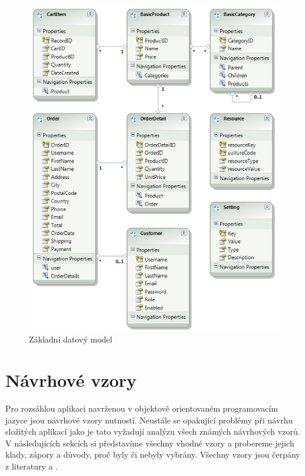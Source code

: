 \documentclass[11pt,twoside,a4paper]{book}
\begin{document}
\begin{figure}[h!]
\begin{center}
\includegraphics[scale=1]{figures/datamodel}
\caption{Základní datový model}
\label{fig:datamodel}
\end{center}
\end{figure}


\section{Návrhové vzory}

Pro rozsáhlou aplikaci navrženou v objektově orientovaném programovacím jazyce jsou návrhové vzory nutností. Neustále se opakující problémy při návrhu složitých aplikací jako je tato vyžadují analýzu všech známých návrhových vzorů. V následujících sekcích si představíme všechny vhodné vzory a probereme jejich klady, zápory a důvody, proč byly či nebyly vybrány. Všechny vzory jsou čerpány z literatury \cite{GOF} a \cite{PEAA}.
\end{document}
